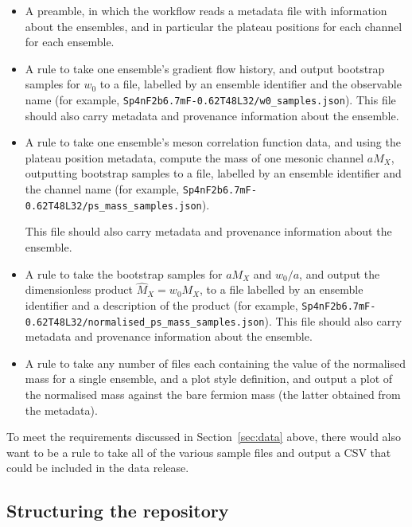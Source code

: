 \documentclass{article}
\begin{document}
\begin{itemize}
  \item
        A preamble,
        in which the workflow reads a metadata file with information about the ensembles,
        and in particular the plateau positions for each channel for each ensemble.
  \item
        A rule to take one ensemble's gradient flow history,
        and output bootstrap samples for $w_{0}$ to a file,
        labelled by an ensemble identifier and the observable name
        (for example,
        \texttt{Sp4nF2b6.7mF-0.62T48L32/\hspace{0pt}w0\_samples.json}).
        This file should also carry metadata and provenance information about the ensemble.
  \item
        A rule to take one ensemble's meson correlation function data,
        and using the plateau position metadata,
        compute the mass of one mesonic channel $aM_{X}$,
        outputting bootstrap samples to a file,
        labelled by an ensemble identifier and the channel name
        (for example,
        \texttt{Sp4nF2b6.7mF-0.62T48L32/\hspace{0pt}ps\_mass\_samples.json}).

        This file should also carry metadata and provenance information about the ensemble.
  \item
        A rule to take the bootstrap samples for $aM_{X}$ and $w_{0}/a$,
        and output the dimensionless product $\hat{M}_{X}=w_{0}M_{X}$,
        to a file labelled by an ensemble identifier and a description of the product
        (for example,
        \texttt{Sp4nF2b6.7mF-0.62T48L32/\hspace{0pt}normalised\_ps\_mass\_samples.json}).
        This file should also carry metadata and provenance information about the ensemble.
  \item
        A rule to take any number of files
        each containing the value of the normalised mass for a single ensemble,
        and a plot style definition,
        and output a plot of the normalised mass against the bare fermion mass
        (the latter obtained from the metadata).
\end{itemize}

To meet the requirements discussed in Section~\ref{sec:data} above,
there would also want to be a rule to take all of the various sample files
and output a CSV that could be included in the data release.

\subsection{Structuring the repository}\label{sec:repository-structure}
\end{document}
